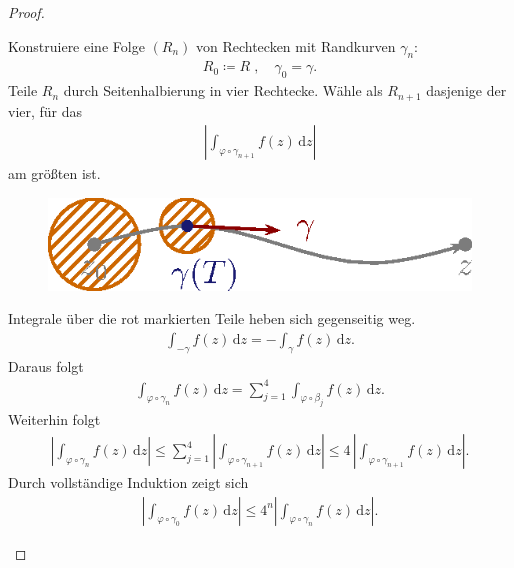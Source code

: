 \documentclass[a4paper,10pt]{scrbook}
\begin{document}
\begin{theorem}
\begin{proof}
\begin{enum-arab}
      \item \label{itm:2.4 3.} Konstruiere eine Folge $(R_n)$ von Rechtecken mit Randkurven $\gamma_n$:
      \begin{align*}
        R_0 \coloneq R \; , \quad \gamma_0 = \gamma.
      \end{align*}
      Teile $R_n$ durch Seitenhalbierung in vier Rechtecke. Wähle als $R_{n+1}$ dasjenige der vier, für das
      \begin{align*}
        \left| \int_{\varphi \circ \gamma_{n+1}} f(z) \, \mathrm{d}z \right|
      \end{align*}
      am größten ist.
      \begin{figure}[H]
        \centering
        \includegraphics[scale=0.2]{images/ana3-tmp-14}
      \end{figure}
      Integrale über die {\color{DarkRed} rot} markierten Teile heben sich gegenseitig weg.
      \begin{align*}
        \int_{-\gamma} f(z) \, \mathrm{d}z = - \int_{\gamma} f(z) \, \mathrm{d}z.
      \end{align*}
      Daraus folgt
      \begin{align*}
        \int_{\varphi \circ \gamma_n} f(z) \, \mathrm{d}z = \sum\limits_{j = 1}^{4} \int_{\varphi \circ \beta_j} f(z) \, \mathrm{d}z.
      \end{align*}
      Weiterhin folgt
      \begin{align*}
        \left| \int_{\varphi \circ \gamma_n} f(z) \, \mathrm{d}z \right|
        \leq \sum\limits_{j = 1}^{4} \left| \int_{\varphi \circ \gamma_{n+1}} f(z) \, \mathrm{d}z \right|
        \leq 4 \, \left| \int_{\varphi \circ \gamma_{n+1}} f(z) \, \mathrm{d}z \right|.
      \end{align*}
      Durch vollständige Induktion zeigt sich
      \begin{align*}
        \left| \int_{\varphi \circ \gamma_0} f(z) \, \mathrm{d}z \right|
        \leq 4^n \left| \int_{\varphi \circ \gamma_n} f(z) \, \mathrm{d}z \right|.
      \end{align*}


\end{enum-arab}
\end{proof}
\end{theorem}
\end{document}
